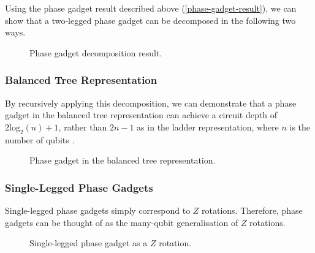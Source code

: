 Using the phase gadget result described above (\ref{phase-gadget-result}), we can show that a two-legged phase gadget can be decomposed in the following two ways.

\begin{figure}[H]
    \centering
    \caption{Phase gadget decomposition result.}
    \label{phase-gadget-decomposition}
\end{figure}

\subsubsection{Balanced Tree Representation}%
By recursively applying this decomposition, we can demonstrate that a phase gadget in the balanced tree representation can achieve a circuit depth of $2\text{log}_2(n) + 1$, rather than $2n - 1$ as in the ladder representation, where $n$ is the number of qubits \cite{Cowtan2019}.

\begin{figure}[H]
    \centering
    \caption{Phase gadget in the balanced tree representation.}
    \label{balanced-tree}
\end{figure}

\subsubsection{Single-Legged Phase Gadgets}
Single-legged phase gadgets simply correspond to $Z$ rotations. Therefore, phase gadgets can be thought of as the many-qubit generalisation of $Z$ rotations.

\begin{figure}[H]
    \centering
    \caption{Single-legged phase gadget as a $Z$ rotation.}
    \label{phase-gadget-single-leg}
\end{figure}

